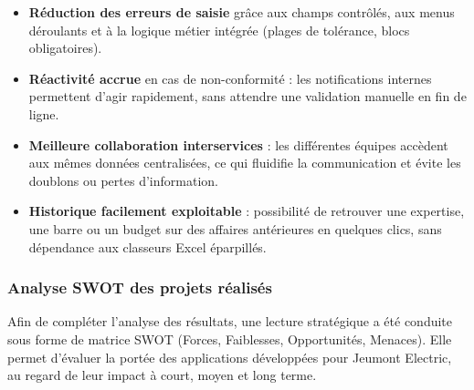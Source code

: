 \documentclass[11pt,a4paper]{article}
\begin{document}
\begin{itemize}
    \item \textbf{Réduction des erreurs de saisie} grâce aux champs contrôlés, aux menus déroulants et à la logique métier intégrée (plages de tolérance, blocs obligatoires).
    
    \item \textbf{Réactivité accrue} en cas de non-conformité : les notifications internes permettent d’agir rapidement, sans attendre une validation manuelle en fin de ligne.
    
    \item \textbf{Meilleure collaboration interservices} : les différentes équipes accèdent aux mêmes données centralisées, ce qui fluidifie la communication et évite les doublons ou pertes d’information.
    
    \item \textbf{Historique facilement exploitable} : possibilité de retrouver une expertise, une barre ou un budget sur des affaires antérieures en quelques clics, sans dépendance aux classeurs Excel éparpillés.
\end{itemize}

\newpage
\subsubsection{Analyse SWOT des projets réalisés}

Afin de compléter l’analyse des résultats, une lecture stratégique a été conduite sous forme de matrice SWOT (Forces, Faiblesses, Opportunités, Menaces). Elle permet d’évaluer la portée des applications développées pour Jeumont Electric, au regard de leur impact à court, moyen et long terme.
\end{document}
